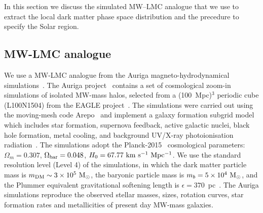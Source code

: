 \documentclass[12pt]{article}
\newcommand{\Msun}{{\rm M}_\odot}
\begin{document}
In this section we discuss the simulated MW–LMC analogue that we use to extract the  local dark matter phase space distribution and the precedure to specify the Solar region.


\subsection{MW-LMC analogue}

We use a MW-LMC analogue from the Auriga magneto-hydrodynamical simulations~\cite{Grand:2016mgo, Grand:2024}. The Auriga project~\cite{Grand:2016mgo} contains a set of cosmological zoom-in simulations of isolated MW-mass halos, selected from a (100~Mpc)$^3$ periodic cube (L100N1504) from the EAGLE project~\cite{Schaye:2014tpa, Crain:2015poa}. The simulations were carried out using the moving-mesh code Arepo~\cite{Springel:2009aa} and implement a galaxy formation subgrid model which includes star formation, supernova feedback, active galactic nuclei, black hole formation, metal cooling,  and background UV/X-ray photoionisation radiation~\cite{Grand:2016mgo}. The simulations adopt the Planck-2015~\cite{Planck:2015fie} cosmological parameters: $\Omega_{m}=0.307$, $\Omega_{\rm bar}=0.048$, $H_0=67.77~{\rm km~s^{-1}~Mpc^{-1}}$. We use the standard resolution level (Level 4) of the simulations, in which the dark matter particle mass is $m_{\rm DM} \sim 3\times 10^5~\Msun$, the baryonic particle mass is $m_b=5\times10^4~\Msun$, and the Plummer equivalent gravitational softening length is $\epsilon=370$~pc~\cite{Power:2002sw,Jenkins2013}.  The Auriga simulations reproduce the observed stellar masses, sizes, rotation curves, star formation rates and metallicities of present day MW-mass galaxies.
\end{document}
